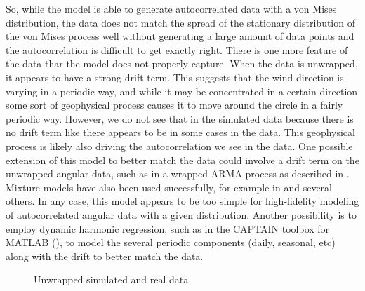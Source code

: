 \documentclass[12pt]{article}
\numberwithin{equation}{section}
\numberwithin{figure}{section}
\begin{document}
So, while the model is able to generate autocorrelated data with a von Mises distribution, the data does not match the spread of the stationary distribution of the von Mises process well without generating a large amount of data points and the autocorrelation is difficult to get exactly right. There is one more feature of the data thar the model does not properly capture. When the data is unwrapped, it appears to have a strong drift term. This suggests that the wind direction is varying in a periodic way, and while it may be concentrated in a certain direction some sort of geophysical process causes it to move around the circle in a fairly periodic way. However, we do not see that in the simulated data because there is no drift term like there appears to be in some cases in the data. This geophysical process is likely also driving the autocorrelation we see in the data. One possible extension of this model to better match the data could involve a drift term on the unwrapped angular data, such as in a wrapped ARMA process as described in \cite{Harvey}. Mixture models have also been used successfully, for example in \cite{Al Yammahi} and several others. In any case, this model appears to be too simple for high-fidelity modeling of autocorrelated angular data with a given distribution. Another possibility is to employ dynamic harmonic regression, such as in the CAPTAIN toolbox for MATLAB (\cite{CAPTAIN}), to model the several periodic components (daily, seasonal, etc) along with the drift to better match the data. 
\begin{figure}[h]
\centering
{}
\caption{Unwrapped simulated and real data}\label{fig:unwrap}
\end{figure}
\end{document}
